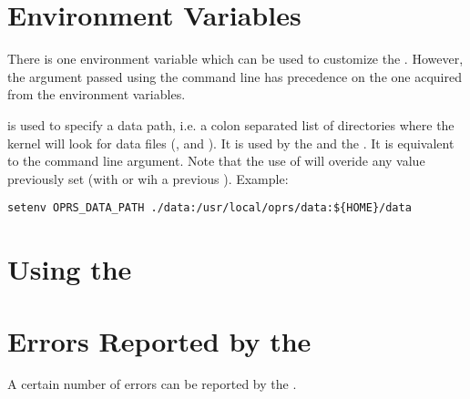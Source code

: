 \section{\OPC{} Environment Variables}

There is one environment variable which can be used to customize the \OPC{}.
However, the argument passed using the command line has precedence on the one
acquired from the environment variables.

\begin{description}


\item[\code{OPRS\_DATA\_PATH}] is used  to specify a data path, i.e. a colon separated
list of directories where the kernel will look for data files (,
 and ). It is used by the \CPK{} and the \XPK{}. It is
equivalent to the  command line argument. Note that the use of
 will overide any value previously set (with  
or wih a previous ).\*
Example:
\begin{verbatim}
setenv OPRS_DATA_PATH ./data:/usr/local/oprs/data:${HOME}/data
\end{verbatim}

\end{description}

\section{Using the \OPC{}}

\section{Errors Reported by the \OPC{}}

A certain number of errors can be reported by the \OPC{}.

